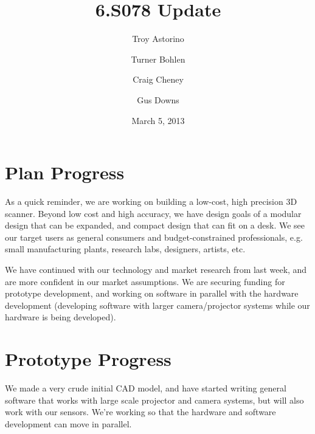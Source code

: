 \documentclass[10pt]{article}
\title{\vspace{-4em}6.S078 Update}
\author{Troy Astorino \and Turner Bohlen \and Craig Cheney \and Gus Downs}
\date{March 5, 2013}
\begin{document}
\maketitle
\vspace{-4em}

\section{Plan Progress}
As a quick reminder, we are working on building a low-cost, high precision 3D
scanner. Beyond low cost and high accuracy, we have design goals of a modular
design that can be expanded, and compact design that can fit on a desk. We see
our target users as general consumers and budget-constrained professionals, e.g.
small manufacturing plants, research labs, designers, artists, etc.

We have continued with our technology and market research from last week, and are more
confident in our market assumptions. We are securing funding for prototype
development, and working on software in parallel with the hardware development
(developing software with larger camera/projector systems while our hardware is
being developed).

\section{Prototype Progress}
We made a very crude initial CAD model, and have started writing general
software that works with large scale projector and camera systems, but will also
work with our sensors.  We're working so that the hardware and software
development can move in parallel.
\end{document}
